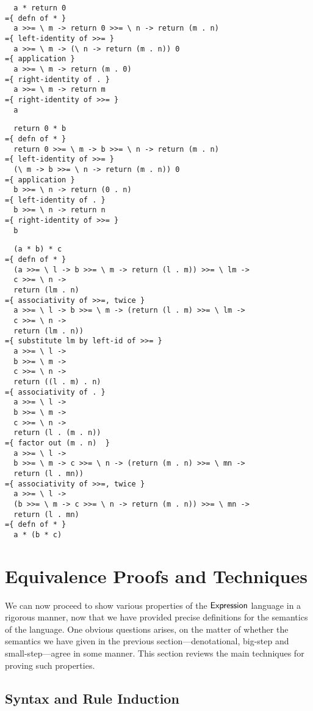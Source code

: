 \begin{verbatim}
  a * return 0
={ defn of * }
  a >>= \ m -> return 0 >>= \ n -> return (m . n)
={ left-identity of >>= }
  a >>= \ m -> (\ n -> return (m . n)) 0
={ application }
  a >>= \ m -> return (m . 0)
={ right-identity of . }
  a >>= \ m -> return m
={ right-identity of >>= }
  a
\end{verbatim}
\begin{verbatim}
  return 0 * b
={ defn of * }
  return 0 >>= \ m -> b >>= \ n -> return (m . n)
={ left-identity of >>= }
  (\ m -> b >>= \ n -> return (m . n)) 0
={ application }
  b >>= \ n -> return (0 . n)
={ left-identity of . }
  b >>= \ n -> return n
={ right-identity of >>= }
  b
\end{verbatim}
\begin{verbatim}
  (a * b) * c
={ defn of * }
  (a >>= \ l -> b >>= \ m -> return (l . m)) >>= \ lm ->
  c >>= \ n ->
  return (lm . n)
={ associativity of >>=, twice }
  a >>= \ l -> b >>= \ m -> (return (l . m) >>= \ lm ->
  c >>= \ n ->
  return (lm . n))
={ substitute lm by left-id of >>= }
  a >>= \ l ->
  b >>= \ m ->
  c >>= \ n ->
  return ((l . m) . n)
={ associativity of . }
  a >>= \ l ->
  b >>= \ m ->
  c >>= \ n ->
  return (l . (m . n))
={ factor out (m . n)  }
  a >>= \ l ->
  b >>= \ m -> c >>= \ n -> (return (m . n) >>= \ mn ->
  return (l . mn))
={ associativity of >>=, twice }
  a >>= \ l ->
  (b >>= \ m -> c >>= \ n -> return (m . n)) >>= \ mn ->
  return (l . mn)
={ defn of * }
  a * (b * c)
\end{verbatim}


\section{Equivalence Proofs and Techniques}%

We can now proceed to show various properties of the $\mathsf{Expression}$ language
in a rigorous manner, now that we have provided precise definitions for the
semantics of the language. One obvious questions arises, on the matter of
whether the semantics we have given in the previous section---denotational,
big-step and small-step---agree in some manner. This section reviews the
main techniques for proving such properties.

\subsection{Syntax and Rule Induction}%

